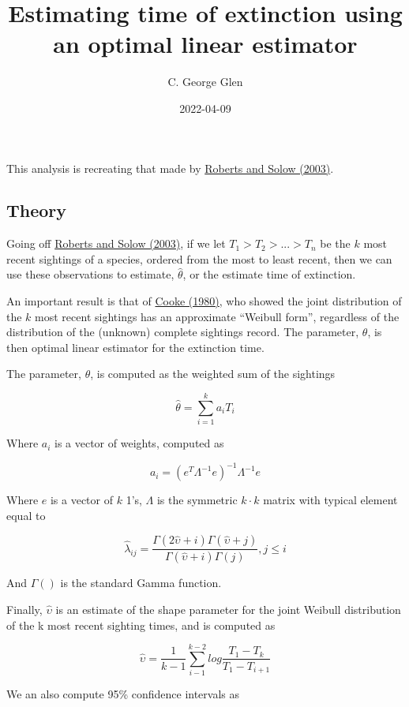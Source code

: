 \documentclass[
]{article}
\title{Estimating time of extinction using an optimal linear estimator}
\author{C. George Glen}
\date{2022-04-09}
\begin{document}
\maketitle

This analysis is recreating that made by
\href{https://www.nature.com/articles/426245a}{Roberts and Solow
(2003)}.

\hypertarget{theory}{%
\subsection{Theory}\label{theory}}

Going off \href{https://www.nature.com/articles/426245a}{Roberts and
Solow (2003)}, if we let \(T_1 > T_2 > ... > T_n\) be the \(k\) most
recent sightings of a species, ordered from the most to least recent,
then we can use these observations to estimate, \(\hat\theta\), or the
estimate time of extinction.

An important result is that of
\href{https://academic.oup.com/biomet/article-abstract/67/1/257/276536}{Cooke
(1980)}, who showed the joint distribution of the \(k\) most recent
sightings has an approximate ``Weibull form'', regardless of the
distribution of the (unknown) complete sightings record. The parameter,
\(\theta\), is then optimal linear estimator for the extinction time.

The parameter, \(\theta\), is computed as the weighted sum of the
sightings

\[ 
\hat\theta = \sum^k_{i=1} a_i T_i
\]

Where \(a_i\) is a vector of weights, computed as

\[
a_i = (e^T \Lambda^{-1} e)^{-1} \Lambda^{-1} e
\]

Where \(e\) is a vector of \(k\) 1's, \(\Lambda\) is the symmetric
\(k \cdot k\) matrix with typical element equal to

\[
\hat\lambda_{ij} = \frac{\Gamma(2 \hat\upsilon + i) \Gamma(\hat\upsilon + j) }{\Gamma(\hat\upsilon + i)\Gamma(j)}, j \leq i 
\]

And \(\Gamma()\) is the standard Gamma function.

Finally, \(\hat\upsilon\) is an estimate of the shape parameter for the
joint Weibull distribution of the k most recent sighting times, and is
computed as

\[
\hat\upsilon = \frac{1}{k-1}\sum_{i-1}^{k-2} log \frac{T_1 - T_k}{T_1 - T_{i+1}}
\]

We an also compute 95\% confidence intervals as
\end{document}
